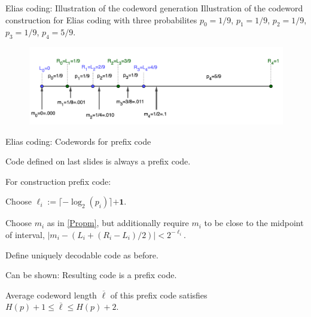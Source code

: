 \begin{frame}{Elias coding: Illustration of the codeword generation}
Illustration of the codeword construction for Elias coding with three probabilites $p_0=1/9$, $p_1=1/9$, $p_2=1/9$, $p_3=1/9$, $p_4=5/9$.  
\begin{center}
\begin{figure}
\includegraphics[width=1.0\textwidth]{LosslessIII/Elias_Coding.png}
\end{figure}
\end{center}
\end{frame}


\begin{frame}{Elias coding: Codewords for prefix code}

\bit
\item Code defined on last slides is  always a prefix code.
\item For construction prefix code: 
\bit
\item Choose $\ell_i:=\lceil-\log_2(p_i)\rceil\mathbf{+1}$.
\item Choose $m_i$ as in \eqref{Propm},  but additionally require $m_i$ to be close to the midpoint of interval,  $|m_i-(L_i+(R_i-L_i)/2)|<2^{-\ell_i}$.
\item Define uniquely decodable code as before.
\eit
\item Can be shown: Resulting code is a prefix code.
\item Average codeword length $\overline{\ell}$ of this prefix code satisfies $H(p)+1\leq \overline{\ell}\leq H(p)+2$. 
\eit
\end{frame}

